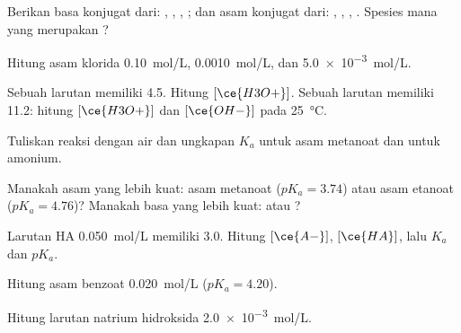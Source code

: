 \begin{exercise}[$\star$]\label{exo:g12:ka-and-pka:1}
Berikan basa konjugat dari: , , , ;
dan asam konjugat dari: , , , .
Spesies mana yang merupakan ?
\end{exercise}

\begin{exercise}[$\star$]\label{exo:g12:ka-and-pka:2}
Hitung  asam klorida \qty{0.10}{mol/L}, \qty{0.0010}{mol/L}, dan
\qty{5.0e-3}{mol/L}.
\end{exercise}

\begin{exercise}[$\star$]\label{exo:g12:ka-and-pka:3}
Sebuah larutan memiliki  4.5. Hitung $[\ce{H3O+}]$. Sebuah larutan
memiliki  11.2: hitung $[\ce{H3O+}]$ dan $[\ce{OH-}]$ pada
\qty{25}{\celsius}.
\end{exercise}

\begin{exercise}[$\star$]\label{exo:g12:ka-and-pka:4}
Tuliskan reaksi dengan air dan ungkapan $K_a$ untuk asam metanoat dan
untuk  amonium.
\end{exercise}

\begin{exercise}[$\star$]\label{exo:g12:ka-and-pka:5}
Manakah asam yang lebih kuat: asam metanoat ($pK_a = 3.74$) atau asam
etanoat ($pK_a = 4.76$)? Manakah basa yang lebih kuat:  atau
?
\end{exercise}

\begin{exercise}[$\star\star$]\label{exo:g12:ka-and-pka:6}
Larutan  HA \qty{0.050}{mol/L} memiliki  3.0. Hitung
$[\ce{A-}]$, $[\ce{HA}]$, lalu $K_a$ dan $pK_a$.
\end{exercise}

\begin{exercise}[$\star\star$]\label{exo:g12:ka-and-pka:7}
Hitung  asam benzoat \qty{0.020}{mol/L} ($pK_a = 4.20$).
\end{exercise}

\begin{exercise}[$\star\star$]\label{exo:g12:ka-and-pka:8}
Hitung  larutan natrium hidroksida \qty{2.0e-3}{mol/L}.
\end{exercise}

